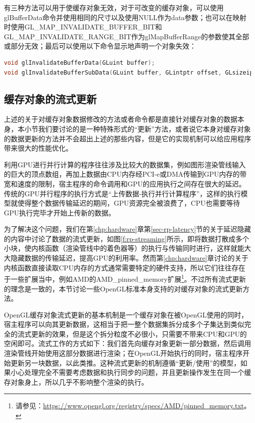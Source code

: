 有三种方法可以用于使缓存对象无效，对于可改变的缓存对象，可以使用glBufferData​命令并使用相同的尺寸以及使用NULL作为data参数；也可以在映射时使用GL\_MAP\_INVALIDATE\_BUFFER\_BIT和GL\_MAP\_INVALIDATE\_RANGE\_BIT作为glMapBufferRange​的参数使其全部或部分无效；最后可以使用以下命令显示地声明一个对象失效：

\begin{lstlisting}[language=C++]
void glInvalidateBufferData​(GLuint buffer​);
void glInvalidateBufferSubData​(GLuint buffer​, GLintptr offset​, GLsizeiptr length​);
\end{lstlisting}





\subsection{缓存对象的流式更新}
上述的关于对缓存对象数据修改的方法或者命令都是直接针对缓存对象的数据本身，本小节我们要讨论的是一种特殊形式的“更新”方法，或者说它本身对缓存对象的数据更新的方法并不会超出上述的那些内容，但是它的实现机制可以给应用程序带来很大的性能优化。

利用GPU进行并行计算的程序往往涉及比较大的数据集，例如图形渲染管线输入的巨大的顶点数组，再加上数据由CPU内存经PCI-e或DMA传输到GPU内存的带宽和速度的限制，宿主程序的命令调用和GPU的应用执行之间存在很大的延迟。传统的GPU并行程序的执行方式是“上传数据-执行并行计算程序”，这样的执行模型就使得整个数据传输延迟的期间，GPU资源完全被浪费了，CPU也需要等待GPU执行完毕才开始上传新的数据。

为了解决这个问题，我们在第\ref{chp:hardware}章第\ref{sec-rp-latency}节的关于延迟隐藏的内容中讨论了数据的流式更新，如图\ref{f:rp-streaming}所示，即将数据打散成多个小块，使内核函数（渲染管线中的着色器等）的执行与传输同时进行，这样就能大大隐藏数据的传输延迟，提高GPU的利用率。然而第\ref{chp:hardware}章讨论的关于内核函数直接读取CPU内存的方式通常需要特定的硬件支持，所以它们往往存在于一些扩展当中，例如AMD的AMD\_pinned\_memory扩展\footnote{请参见：\url{https://www.opengl.org/registry/specs/AMD/pinned_memory.txt}。}。不过所有流式更新的理念是一致的，本节讨论一些OpenGL标准本身支持的对缓存对象的流式更新方法。

OpenGL缓存对象流式更新的基本机制是一个缓存对象在被OpenGL使用的同时，宿主程序可以向其更新数据，这相当于把一整个数据集拆分成多个子集达到类似完全的流式更新的效果，但是这个拆分粒度不必很小，只需要不带来CPU和GPU的空闲即可。流式工作的方式如下：我们首先向缓存对象更新一部分数据，然后调用渲染管线开始使用这部分数据进行渲染；在OpenGL开始执行的同时，宿主程序开始更新另一块数据，以此类推。这种流式更新的机制遵循“更新/使用”的模型，如果小心处理完全不需要考虑数据和执行同步的问题，并且更新操作发生在同一个缓存对象身上，所以几乎不影响整个渲染的执行。

